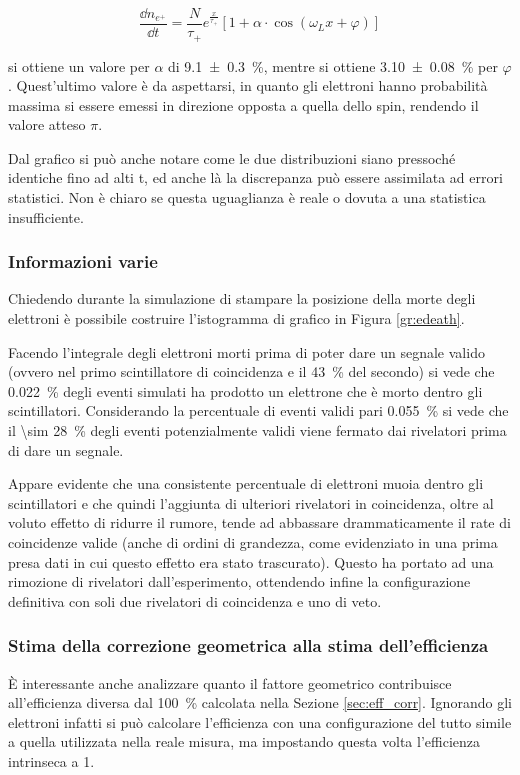 \begin{equation}
	\frac{\dd n_{e^+}}{\dd t} = \frac{N}{\tau_+}e^{\frac{x}{\tau_+}}\left[1 + \alpha\cdot\cos(\omega_L x + \varphi)\right]
	\label{eq:sim_fit}
\end{equation}

si ottiene un valore per $\alpha$ di \SI{9.1 \pm 0.3}{\percent}, mentre si ottiene \SI{3.10 \pm 0.08}{\percent} per $\varphi$. Quest'ultimo valore \`e da aspettarsi, in quanto gli elettroni hanno probabilit\`a massima si essere emessi in direzione opposta a quella dello spin, rendendo il valore atteso $\pi$.

Dal grafico si pu\`o anche notare come le due distribuzioni siano pressoch\'e identiche fino ad alti t, ed anche l\`a la discrepanza pu\`o essere assimilata ad errori statistici. Non \`e chiaro se questa uguaglianza \`e reale o dovuta a una statistica insufficiente.

\subsubsection{Informazioni varie}
Chiedendo durante la simulazione di stampare la posizione della morte degli elettroni \`e possibile costruire l'istogramma di grafico in Figura \ref{gr:edeath}.

Facendo l'integrale degli elettroni morti prima di poter dare un segnale valido (ovvero nel primo scintillatore di coincidenza e il \SI{43}{\percent} del secondo) si vede che \SI{0.022}{\percent} degli eventi simulati ha prodotto un elettrone che \`e morto dentro gli scintillatori.
Considerando la percentuale di eventi validi pari \SI{0.055}{\percent} si vede che il \SI{\sim 28}{\percent} degli eventi potenzialmente validi viene fermato dai rivelatori prima di dare un segnale.

Appare evidente che una consistente percentuale di elettroni muoia dentro gli scintillatori e che quindi l'aggiunta di ulteriori rivelatori in coincidenza, oltre al voluto effetto di ridurre il rumore, tende ad abbassare drammaticamente il rate di coincidenze valide (anche di ordini di grandezza, come evidenziato in una prima presa dati in cui questo effetto era stato trascurato). Questo ha portato ad una rimozione di rivelatori dall'esperimento, ottendendo infine la configurazione definitiva con soli due rivelatori di coincidenza e uno di veto.


\subsubsection{Stima della correzione geometrica alla stima dell'efficienza}
\`E interessante anche analizzare quanto il fattore geometrico contribuisce all'efficienza diversa dal \SI{100}{\percent} calcolata nella Sezione \ref{sec:eff_corr}. Ignorando gli elettroni infatti si pu\`o calcolare l'efficienza con una configurazione del tutto simile a quella utilizzata nella reale misura, ma impostando questa volta l'efficienza intrinseca a 1.

